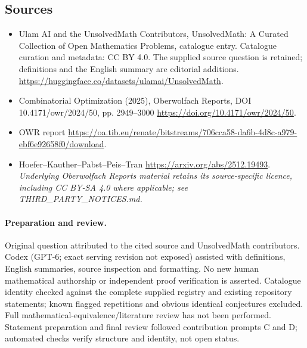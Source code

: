\documentclass[11pt]{article}
\begin{document}
\subsection{Sources}
\begin{itemize}
\item[\hypertarget{source:statement:1}{S1}] Ulam AI and the UnsolvedMath Contributors, UnsolvedMath: A Curated Collection of Open Mathematics Problems, catalogue entry. Catalogue curation and metadata: CC BY 4.0. The supplied source question is retained; definitions and the English summary are editorial additions.
\url{https://huggingface.co/datasets/ulamai/UnsolvedMath}.
\item[\hypertarget{source:statement:2}{S2}] Combinatorial Optimization (2025), Oberwolfach Reports, DOI 10.4171/owr/2024/50, pp. 2949--3000
\url{https://doi.org/10.4171/owr/2024/50}.
\item[\hypertarget{source:statement:3}{S3}] OWR report
\url{https://oa.tib.eu/renate/bitstreams/706cca58-da6b-4d8c-a979-ebf6e92658f0/download}.
\item[\hypertarget{source:statement:4}{S4}] Hoefer--Kauther--Pabst--Peis--Tran
\url{https://arxiv.org/abs/2512.19493}.
\textit{Underlying Oberwolfach Reports material retains its source-specific licence, including CC BY-SA 4.0 where applicable; see THIRD\_PARTY\_NOTICES.md.}
\end{itemize}
\paragraph{Preparation and review.}
Original question attributed to the cited source and UnsolvedMath contributors. Codex (GPT-6; exact serving revision not exposed) assisted with definitions, English summaries, source inspection and formatting. No new human mathematical authorship or independent proof verification is asserted. Catalogue identity checked against the complete supplied registry and existing repository statements; known flagged repetitions and obvious identical conjectures excluded. Full mathematical-equivalence/literature review has not been performed. Statement preparation and final review followed contribution prompts C and D; automated checks verify structure and identity, not open status.
\label{end:statement}
\end{document}
